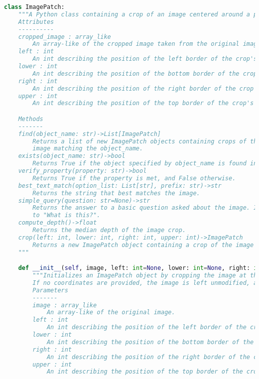\documentclass[10pt,twocolumn,letterpaper]{article}
\begin{document}
\begin{lstlisting}[language=Python, xleftmargin=.0\textwidth, xrightmargin=.0\textwidth, caption=\textbf{Full API.}, label={listing}]
class ImagePatch:
    """A Python class containing a crop of an image centered around a particular object, as well as relevant information.
    Attributes
    ----------
    cropped_image : array_like
        An array-like of the cropped image taken from the original image.
    left : int
        An int describing the position of the left border of the crop's bounding box in the original image.
    lower : int
        An int describing the position of the bottom border of the crop's bounding box in the original image.
    right : int
        An int describing the position of the right border of the crop's bounding box in the original image.
    upper : int
        An int describing the position of the top border of the crop's bounding box in the original image.

    Methods
    -------
    find(object_name: str)->List[ImagePatch]
        Returns a list of new ImagePatch objects containing crops of the image centered around any objects found in the
        image matching the object_name.
    exists(object_name: str)->bool
        Returns True if the object specified by object_name is found in the image, and False otherwise.
    verify_property(property: str)->bool
        Returns True if the property is met, and False otherwise.
    best_text_match(option_list: List[str], prefix: str)->str
        Returns the string that best matches the image.
    simple_query(question: str=None)->str
        Returns the answer to a basic question asked about the image. If no question is provided, returns the answer
        to "What is this?".
    compute_depth()->float
        Returns the median depth of the image crop.
    crop(left: int, lower: int, right: int, upper: int)->ImagePatch
        Returns a new ImagePatch object containing a crop of the image at the given coordinates.
    """

    def __init__(self, image, left: int=None, lower: int=None, right: int=None, upper: int=None):
        """Initializes an ImagePatch object by cropping the image at the given coordinates and stores the coordinates as attributes.
        If no coordinates are provided, the image is left unmodified, and the coordinates are set to the dimensions of the image.
        Parameters
        -------
        image : array_like
            An array-like of the original image.
        left : int
            An int describing the position of the left border of the crop's bounding box in the original image.
        lower : int
            An int describing the position of the bottom border of the crop's bounding box in the original image.
        right : int
            An int describing the position of the right border of the crop's bounding box in the original image.
        upper : int
            An int describing the position of the top border of the crop's bounding box in the original image.


\end{lstlisting}
\end{document}
